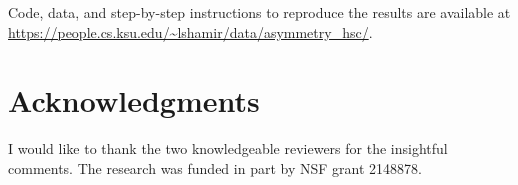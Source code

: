 \documentclass[final,5p,times,twocolumn]{article}
\begin{document}
Code, data, and step-by-step instructions to reproduce the results are available at \url{https://people.cs.ksu.edu/~lshamir/data/asymmetry_hsc/}.




\section*{Acknowledgments}
              
I would like to thank the two knowledgeable reviewers for the insightful comments. The research was funded in part by NSF grant 2148878.





%
%
 
 
\end{document}
